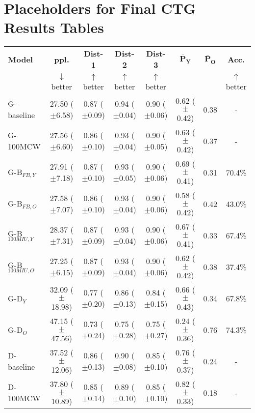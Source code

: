 \section{Placeholders for Final CTG Results Tables}

\begin{table*}[h]
    \centering
    \begin{tabular}{l | c c c c | c c c}
    \toprule
    \textbf{Model} & \textbf{ppl.} & \textbf{Dist-1} & \textbf{Dist-2} & \textbf{Dist-3} & $\boldsymbol{\bar{P}_Y}$ & $\boldsymbol{\bar{P}_O}$ & \textbf{Acc.}\\
     & $\downarrow$ better & $\uparrow$ better & $\uparrow$ better & $\uparrow$ better & & & $\uparrow$ better\\
    \midrule
    \midrule
    G-baseline & 27.50 ($\pm$6.58) & 0.87 ($\pm$0.09) & 0.94 ($\pm$0.04) & 0.90 ($\pm$0.06) & 0.62 ($\pm$0.42) & 0.38 & -\\
    G-100MCW & 27.56 ($\pm$6.60) & 0.86 ($\pm$0.10) & 0.93 ($\pm$0.04) & 0.90 ($\pm$0.05) & 0.63 ($\pm$0.42) & 0.37 & -\\
    \midrule
    G-B$_{FB,Y}$ & 27.91 ($\pm$7.18) & 0.87 ($\pm$0.10) & 0.93 ($\pm$0.05) & 0.90 ($\pm$0.06) & 0.69 ($\pm$0.41) & 0.31 & 70.4\%\\
    G-B$_{FB,O}$ & 27.58 ($\pm$7.07) & 0.86 ($\pm$0.10) & 0.93 ($\pm$0.04) & 0.90 ($\pm$0.06) & 0.58 ($\pm$0.42) & 0.42 & 43.0\%\\
    G-B$_{100MIU,Y}$ & 28.37 ($\pm$7.31) & 0.87 ($\pm$0.09) & 0.93 ($\pm$0.04) & 0.90 ($\pm$0.06) & 0.67 ($\pm$0.41) & 0.33 & 67.4\%\\
    G-B$_{100MIU,O}$ & 27.25 ($\pm$6.15) & 0.87 ($\pm$0.09) & 0.93 ($\pm$0.04) & 0.90 ($\pm$0.06) & 0.62 ($\pm$0.42) & 0.38 & 37.4\%\\
    \midrule
    G-D$_{Y}$ & 32.09 ($\pm$18.98) & 0.77 ($\pm$0.20) & 0.86 ($\pm$0.13) & 0.84 ($\pm$0.15) & 0.66 ($\pm$0.43) & 0.34 & 67.8\%\\
    G-D$_{O}$ & 47.15 ($\pm$47.56) & 0.73 ($\pm$0.24) & 0.75 ($\pm$0.28) & 0.75 ($\pm$0.27) & 0.24 ($\pm$0.36) & 0.76 & 74.3\%\\
    \midrule
    \midrule
    D-baseline & 37.52 ($\pm$12.06) & 0.86 ($\pm$0.13) & 0.90 ($\pm$0.08) & 0.85 ($\pm$0.10) & 0.76 ($\pm$0.37) & 0.24 & -\\
    D-100MCW & 37.80 ($\pm$10.89) & 0.85 ($\pm$0.14) & 0.89 ($\pm$0.10) & 0.85 ($\pm$0.10) & 0.82 ($\pm$0.33) & 0.18 & -\\
    \midrule

\end{tabular}
\end{table*}
